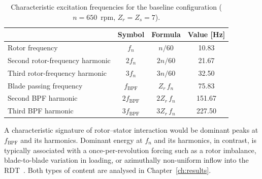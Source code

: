 \begin{table}[H]
\centering
\caption{Characteristic excitation frequencies for the baseline
configuration ($n = 650$~rpm, $Z_r = Z_s = 7$).}
\label{tab:characteristic_freqs}
\begin{tabular}{lccc}
\hline
 & Symbol & Formula & Value [Hz] \\ \hline
Rotor frequency           & $f_n$               & $n/60$         & 10.83  \\
Second rotor-frequency harmonic     & $2f_n$              & $2n/60$        & 21.67  \\
Third rotor-frequency harmonic      & $3f_n$              & $3n/60$        & 32.50  \\
Blade passing frequency   & $f_{\mathrm{BPF}}$  & $Z_r\,f_n$     & 75.83  \\
Second BPF harmonic       & $2f_{\mathrm{BPF}}$ & $2Z_r\,f_n$    & 151.67 \\
Third BPF harmonic        & $3f_{\mathrm{BPF}}$ & $3Z_r\,f_n$    & 227.50 \\ \hline
\end{tabular}
\end{table}

A characteristic signature of rotor--stator interaction would be
dominant peaks at $f_{\mathrm{BPF}}$ and its harmonics. Dominant
energy at $f_n$ and its harmonics, in contrast, is typically
associated with a once-per-revolution forcing such as a rotor
imbalance, blade-to-blade variation in loading, or azimuthally
non-uniform inflow into the \ac{RDT}~\cite{brekke,bergan2018}. Both
types of content are analysed in Chapter~\ref{ch:results}.


